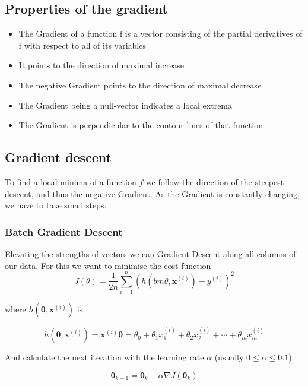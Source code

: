 \documentclass[11pt]{article}
\begin{document}
\subsection{Properties of the gradient}
\begin{itemize}
    \item The Gradient of a function f is a vector consisting of the partial derivatives of f with respect to all of its variables
    \item It points to the direction of maximal increase
    \item The negative Gradient points to the direction of maximal decrease
    \item The Gradient being a null-vector indicates a local extrema
    \item The Gradient is perpendicular to the contour lines of that function
\end{itemize}

\subsection{Gradient descent}
To find a local minima of a function $f$ we follow the direction of the steepest descent, and thus the negative Gradient. As the Gradient is constantly changing, we have to take small steps.

\subsubsection{Batch Gradient Descent}
Elevating the strengths of vectors we can Gradient Descent along all columns of our data. For this we want to minimise the cost function
\begin{equation}
    J(\theta) = \frac{1}{2n}\sum_{i=1}^{n}(h(bm{\theta},\textbf{x}^{(i)})-y^{(i)})^2
\end{equation}

where $h(\bm{\theta},\textbf{x}^{(i)})$ is

\begin{equation}
    h(\bm{\theta},\bm{x}^{(i)}) = \bm{x}^{(i)}\bm{\theta} = \theta_0 + \theta_1 x^{(i)}_1 + \theta_2 x^{(i)}_2 + \cdots + \theta_m x^{(i)}_m
\end{equation}

And calculate the next iteration with the learning rate $\alpha$ (usually $0\leq\alpha\leq0.1$)

\begin{equation}
    \bm{\theta}_{k+1} = \bm{\theta}_{k} -\alpha\nabla J(\bm{\theta}_k)
\end{equation}
\end{document}
